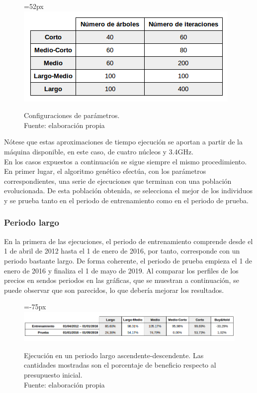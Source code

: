      	\begin{figure}[H]
     		\centering\leftskip=52px
     		\includegraphics[scale=0.65]{imagenes/params.png}
     		\caption[Configuraciones de par\'ametros]{Configuraciones de par\'ametros.\\ Fuente: elaboraci\'on propia}
     		\label{fig:params}
     	\end{figure}

N\'otese que estas aproximaciones de tiempo ejecuci\'on se aportan a partir de la m\'aquina disponible, en este caso, de cuatro n\'ucleos y 3.4GHz.\\

En los casos expuestos a continuaci\'on se sigue siempre el mismo procedimiento. En primer lugar, el algoritmo gen\'etico efect\'ua, con los par\'ametros correspondientes, una serie de ejecuciones que terminan con una poblaci\'on evolucionada. De esta poblaci\'on obtenida, se selecciona el mejor de los individuos y se prueba tanto en el periodo de entrenamiento como en el periodo de prueba.\\

\subsubsection{Periodo largo}

En la primera de las ejecuciones, el periodo de entrenamiento comprende desde el 1 de abril de 2012 hasta el 1 de enero de 2016, por tanto, corresponde con un periodo bastante largo. De forma coherente, el periodo de prueba empieza el 1 de enero de 2016 y finaliza el 1 de mayo de 2019. Al comparar los perfiles de los precios en sendos periodos en las gr\'aficas, que se muestran a continuaci\'on, se puede observar que son parecidos, lo que deber\'ia mejorar los resultados.\\

     	\begin{figure}[H]
     		\centering\leftskip=-75px
     		\includegraphics[scale=0.60]{imagenes/Large_period.png}
     		\caption[Ejecuci\'on en un periodo largo ascendente-descendente]{Ejecuci\'on en un periodo largo ascendente-descendente. Las cantidades mostradas son el porcentaje de beneficio respecto al presupuesto inicial.\\ Fuente: elaboraci\'on propia}
     		\label{fig:large_period}
     	\end{figure}
     	
